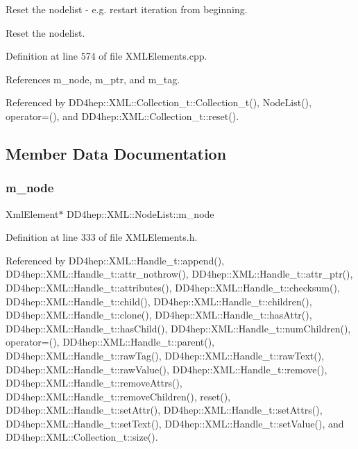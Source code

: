 Reset the nodelist -\/ e.\+g. restart iteration from beginning. 

Reset the nodelist. 

Definition at line 574 of file X\+M\+L\+Elements.\+cpp.



References m\+\_\+node, m\+\_\+ptr, and m\+\_\+tag.



Referenced by D\+D4hep\+::\+X\+M\+L\+::\+Collection\+\_\+t\+::\+Collection\+\_\+t(), Node\+List(), operator=(), and D\+D4hep\+::\+X\+M\+L\+::\+Collection\+\_\+t\+::reset().



\subsection{Member Data Documentation}
\hypertarget{class_d_d4hep_1_1_x_m_l_1_1_node_list_a14d433901c24fd64952a21eb7700ec42}{}\label{class_d_d4hep_1_1_x_m_l_1_1_node_list_a14d433901c24fd64952a21eb7700ec42} 
\subsubsection{\texorpdfstring{m\+\_\+node}{m\_node}}
{\footnotesize\ttfamily Xml\+Element$\ast$ D\+D4hep\+::\+X\+M\+L\+::\+Node\+List\+::m\+\_\+node}



Definition at line 333 of file X\+M\+L\+Elements.\+h.



Referenced by D\+D4hep\+::\+X\+M\+L\+::\+Handle\+\_\+t\+::append(), D\+D4hep\+::\+X\+M\+L\+::\+Handle\+\_\+t\+::attr\+\_\+nothrow(), D\+D4hep\+::\+X\+M\+L\+::\+Handle\+\_\+t\+::attr\+\_\+ptr(), D\+D4hep\+::\+X\+M\+L\+::\+Handle\+\_\+t\+::attributes(), D\+D4hep\+::\+X\+M\+L\+::\+Handle\+\_\+t\+::checksum(), D\+D4hep\+::\+X\+M\+L\+::\+Handle\+\_\+t\+::child(), D\+D4hep\+::\+X\+M\+L\+::\+Handle\+\_\+t\+::children(), D\+D4hep\+::\+X\+M\+L\+::\+Handle\+\_\+t\+::clone(), D\+D4hep\+::\+X\+M\+L\+::\+Handle\+\_\+t\+::has\+Attr(), D\+D4hep\+::\+X\+M\+L\+::\+Handle\+\_\+t\+::has\+Child(), D\+D4hep\+::\+X\+M\+L\+::\+Handle\+\_\+t\+::num\+Children(), operator=(), D\+D4hep\+::\+X\+M\+L\+::\+Handle\+\_\+t\+::parent(), D\+D4hep\+::\+X\+M\+L\+::\+Handle\+\_\+t\+::raw\+Tag(), D\+D4hep\+::\+X\+M\+L\+::\+Handle\+\_\+t\+::raw\+Text(), D\+D4hep\+::\+X\+M\+L\+::\+Handle\+\_\+t\+::raw\+Value(), D\+D4hep\+::\+X\+M\+L\+::\+Handle\+\_\+t\+::remove(), D\+D4hep\+::\+X\+M\+L\+::\+Handle\+\_\+t\+::remove\+Attrs(), D\+D4hep\+::\+X\+M\+L\+::\+Handle\+\_\+t\+::remove\+Children(), reset(), D\+D4hep\+::\+X\+M\+L\+::\+Handle\+\_\+t\+::set\+Attr(), D\+D4hep\+::\+X\+M\+L\+::\+Handle\+\_\+t\+::set\+Attrs(), D\+D4hep\+::\+X\+M\+L\+::\+Handle\+\_\+t\+::set\+Text(), D\+D4hep\+::\+X\+M\+L\+::\+Handle\+\_\+t\+::set\+Value(), and D\+D4hep\+::\+X\+M\+L\+::\+Collection\+\_\+t\+::size().

